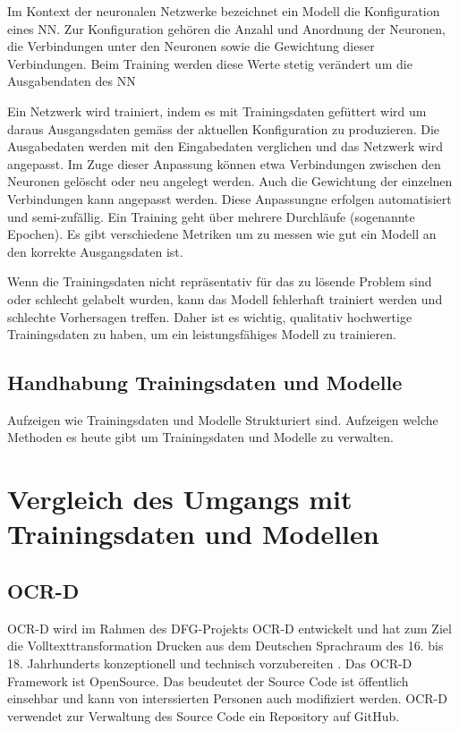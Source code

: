 \documentclass[a4paper,oneside, 12pt]{report}
\begin{document}
Im Kontext der neuronalen Netzwerke bezeichnet ein Modell die Konfiguration eines \ac{NN}. Zur Konfiguration gehören die Anzahl und Anordnung der Neuronen, die Verbindungen unter den Neuronen sowie die Gewichtung dieser Verbindungen. Beim Training werden diese Werte stetig verändert um die Ausgabendaten des \ac{NN}

Ein Netzwerk wird trainiert, indem es mit Trainingsdaten gefüttert wird um daraus Ausgangsdaten gemäss der aktuellen Konfiguration zu produzieren. Die Ausgabedaten werden mit den Eingabedaten verglichen und das Netzwerk wird angepasst. Im Zuge dieser Anpassung können etwa Verbindungen zwischen den Neuronen gelöscht oder neu angelegt werden. Auch die Gewichtung der einzelnen Verbindungen kann angepasst werden. Diese Anpassungne erfolgen automatisiert und semi-zufällig. Ein Training geht über mehrere Durchläufe (sogenannte Epochen). Es gibt verschiedene Metriken um zu messen wie gut ein Modell an den korrekte Ausgangsdaten ist.

Wenn die Trainingsdaten nicht repräsentativ für das zu lösende Problem sind oder schlecht gelabelt wurden, kann das Modell fehlerhaft trainiert werden und schlechte Vorhersagen treffen. Daher ist es wichtig, qualitativ hochwertige Trainingsdaten zu haben, um ein leistungsfähiges Modell zu trainieren.


\section{Handhabung Trainingsdaten und Modelle}
Aufzeigen wie Trainingsdaten und Modelle Strukturiert sind.  Aufzeigen welche Methoden es heute gibt um Trainingsdaten und Modelle zu verwalten.
\chapter{Vergleich des Umgangs mit Trainingsdaten und Modellen}\label{sec:vergleich}

\section{OCR-D}
OCR-D wird im Rahmen des DFG-Projekts OCR-D entwickelt und hat zum Ziel die Volltexttransformation Drucken aus dem Deutschen Sprachraum des 16. bis 18. Jahrhunderts konzeptionell und technisch vorzubereiten \cite{standOCR-D}.  Das OCR-D Framework ist OpenSource. Das beudeutet der Source Code ist öffentlich einsehbar und kann von interssierten Personen auch modifiziert werden. OCR-D verwendet zur Verwaltung des Source Code ein Repository auf GitHub.\cite{ocrdgithub}
\end{document}
